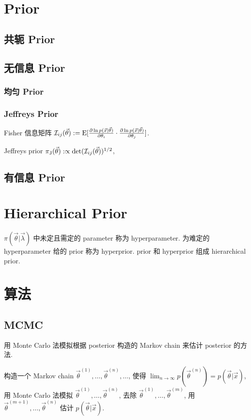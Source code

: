 \section{Prior}

\subsection{共轭 Prior}

\subsection{无信息 Prior}

\subsubsection{均匀 Prior}

\subsubsection{Jeffreys Prior}

Fisher 信息矩阵 $\mathcal{I}_{ij}(\vec{\theta}):=\text{E}[\frac{\partial\ln p(\vec{x}|\vec{\theta})}{\partial \theta_i}\cdot\frac{\partial\ln p(\vec{x}|\vec{\theta})}{\partial \theta_j}]$.

Jeffreys prior $\pi_\text{J}(\vec{\theta}):\propto\det(\mathcal{I}_{ij}(\vec{\theta}))^{1/2}$, 

\subsection{有信息 Prior}

\section{Hierarchical Prior}

$\pi(\vec{\theta}|\vec{\lambda})$ 中未定且需定的 parameter 称为 hyperparameter. 为难定的 hyperparameter 给的 prior 称为 hyperprior. prior 和 hyperprior 组成 hierarchical prior.

\section{算法}

\subsection{MCMC}

用 Monte Carlo 法模拟根据 posterior 构造的 Markov chain 来估计 posterior 的方法.

构造一个 Markov chain $\vec{\theta}^{(1)},\dots,\vec{\theta}^{(n)},\dots$, 使得 $\lim_{n\to\infty}p(\vec{\theta}^{(n)})=p(\vec{\theta}|\vec{x})$, 用 Monte Carlo 法模拟 $\vec{\theta}^{(1)},\dots,\vec{\theta}^{(n)}$, 去除 $\vec{\theta}^{(1)},\dots,\vec{\theta}^{(m)}$, 用 $\vec{\theta}^{(m+1)},\dots,\vec{\theta}^{(n)}$ 估计 $p(\vec{\theta}|\vec{x})$.

